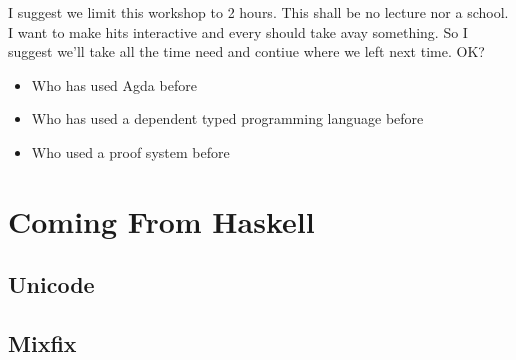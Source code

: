 \documentclass[12pt]{article}
\begin{document}
\tableofcontents{}

I suggest we limit this workshop to 2 hours. This shall be no lecture nor a school.
I want to make hits interactive and every should take avay something. So I suggest
we'll take all the time need and contiue where we left next time. OK?

\begin{itemize}
\item Who has used Agda before
\item Who has used a dependent typed programming language before
  \item Who used a proof system before
\end{itemize}






\section{Coming From Haskell}
\subsection{Unicode}

\subsection{Mixfix}

\printbibliography{}
\end{document}
